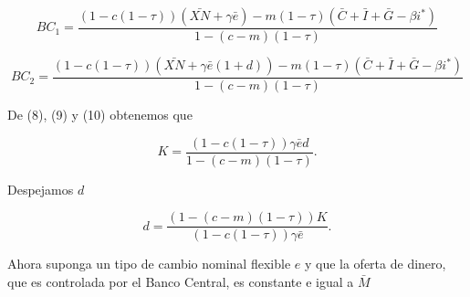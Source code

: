 \documentclass[a4paper]{article}
\begin{document}
\begin{itemize}
\begin{solution}
\[
BC_1 = \frac{(1 - c(1 - \tau))(\bar{XN} + \gamma \bar{e}) - m(1 - \tau)(\bar{C} + \bar{I} + \bar{G} - \beta i^*)}{1 - (c - m)(1 - \tau)} \tag{9}
\]

\[
BC_2 = \frac{(1 - c(1 - \tau))(\bar{XN} + \gamma \bar{e}(1 + d)) - m(1 - \tau)(\bar{C} + \bar{I} + \bar{G} - \beta i^*)}{1 - (c - m)(1 - \tau)} \tag{10}
\]

De (8), (9) y (10) obtenemos que

\[
K = \frac{(1 - c(1 - \tau))\gamma \bar{e}d}{1 - (c - m)(1 - \tau)}.
\]

Despejamos $d$

\[
d = \frac{(1 - (c - m)(1 - \tau))K}{(1 - c(1 - \tau))\gamma \bar{e}}.
\]

\end{solution}


    \end{itemize}

    Ahora suponga un tipo de cambio nominal flexible $e$ y que la oferta de dinero, que es controlada por el Banco Central, es constante e igual a $\bar{M}$
\end{document}
